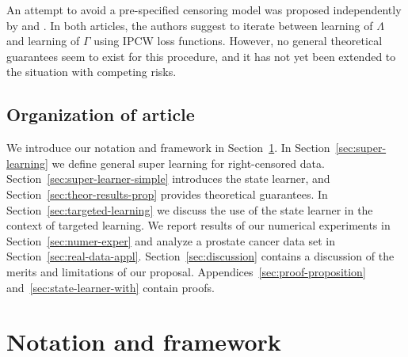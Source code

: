 \documentclass[numsec,webpdf,contemporary,medium,namedate]{oup-authoring-template}%
\theoremstyle{thmstyleone}%
\theoremstyle{thmstyletwo}%
\theoremstyle{thmstylethree}%
\newcommand{\1}{\mathds{1}}
\begin{document}
An attempt to avoid a pre-specified censoring model was proposed
independently by \cite{han2021inverse} and
\cite{westling2021inference}. In both articles, the authors suggest to
iterate between learning of \( \Lambda \) and learning of $\Gamma$
using IPCW loss functions. However, no general theoretical guarantees
seem to exist for this procedure, and it has not yet been extended to
the situation with competing risks.

\subsection{Organization of article}

We introduce our notation and framework in
Section~\ref{sec:framework}. In Section~\ref{sec:super-learning} we
define general super learning for right-censored data.
Section~\ref{sec:super-learner-simple} introduces the state learner,
and Section~\ref{sec:theor-results-prop} provides theoretical
guarantees. In Section~\ref{sec:targeted-learning} we discuss the use
of the state learner in the context of targeted learning. We report
results of our numerical experiments in Section~\ref{sec:numer-exper}
and analyze a prostate cancer data set in
Section~\ref{sec:real-data-appl}.  Section~\ref{sec:discussion}
contains a discussion of the merits and limitations of our
proposal. Appendices~\ref{sec:proof-proposition}
and~\ref{sec:state-learner-with} contain proofs.


\section{Notation and framework}
\label{sec:framework}
\end{document}
